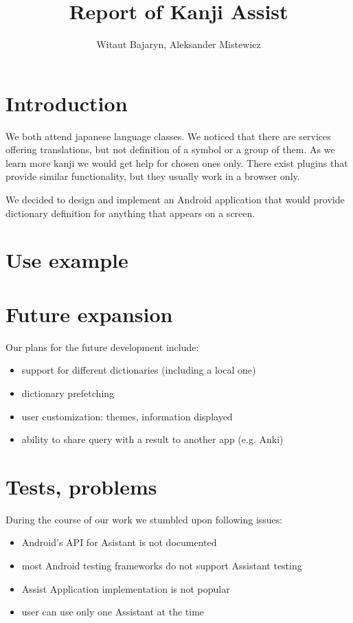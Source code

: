 \documentclass[11pt,a4paper]{article}
\title{Report of Kanji Assist}
\author{Witaut Bajaryn, Aleksander Mistewicz}
\begin{document}
\maketitle
\newpage

\section{Introduction}

We both attend japanese language classes. We noticed that there are services
offering translations, but not definition of a symbol or a group of them.
As we learn more kanji we would get help for chosen ones only.
There exist plugins that provide similar functionality, but they usually
work in a browser only.

We decided to design and implement an Android application that would
provide dictionary definition for anything that appears on a screen.

\section{Use example}

\section{Future expansion}

Our plans for the future development include:
\begin{itemize}
    \item support for different dictionaries (including a local one)
    \item dictionary prefetching
    \item user customization: themes, information displayed
    \item ability to share query with a result to another app (e.g. Anki)
\end{itemize}

\section{Tests, problems}

During the course of our work we stumbled upon following issues:
\begin{itemize}
    \item Android's API for Asistant is not documented
    \item most Android testing frameworks do not support Assistant testing
    \item Assist Application implementation is not popular
    \item user can use only one Assistant at the time
\end{itemize}
\end{document}
